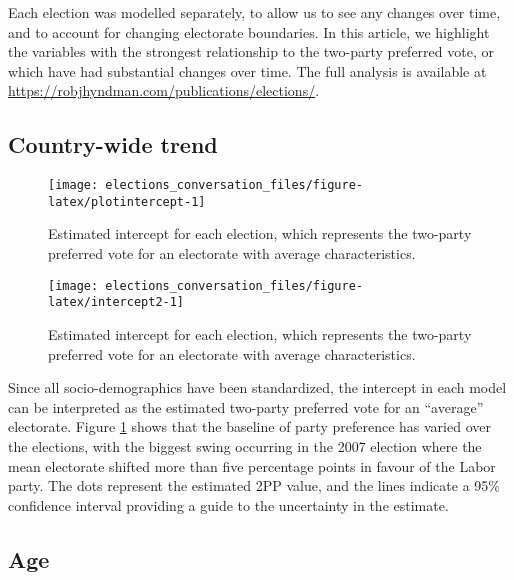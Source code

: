 \documentclass[11pt,a4paper,]{article}
\begin{document}
Each election was modelled separately, to allow us to see any changes over time, and to account for changing electorate boundaries. In this article, we highlight the variables with the strongest relationship to the two-party preferred vote, or which have had substantial changes over time. The full analysis is available at \url{https://robjhyndman.com/publications/elections/}.

\hypertarget{country-wide-trend}{%
\subsection{Country-wide trend}\label{country-wide-trend}}

\begin{figure}[H]

{\centering \texttt{[image: elections\_conversation\_files/figure-latex/plotintercept-1]} 

}

\caption{Estimated intercept for each election, which represents the two-party preferred vote for an electorate with average characteristics.}\label{fig:plotintercept}
\end{figure}

\begin{figure}[H]

{\centering \texttt{[image: elections\_conversation\_files/figure-latex/intercept2-1]} 

}

\caption{Estimated intercept for each election, which represents the two-party preferred vote for an electorate with average characteristics.}\label{fig:intercept2}
\end{figure}

Since all socio-demographics have been standardized, the intercept in each model can be interpreted as the estimated two-party preferred vote for an ``average'' electorate. Figure \ref{fig:plotintercept} shows that the baseline of party preference has varied over the elections, with the biggest swing occurring in the 2007 election where the mean electorate shifted more than five percentage points in favour of the Labor party. The dots represent the estimated 2PP value, and the lines indicate a 95\% confidence interval providing a guide to the uncertainty in the estimate.

\hypertarget{age}{%
\subsection{Age}\label{age}}
\end{document}
